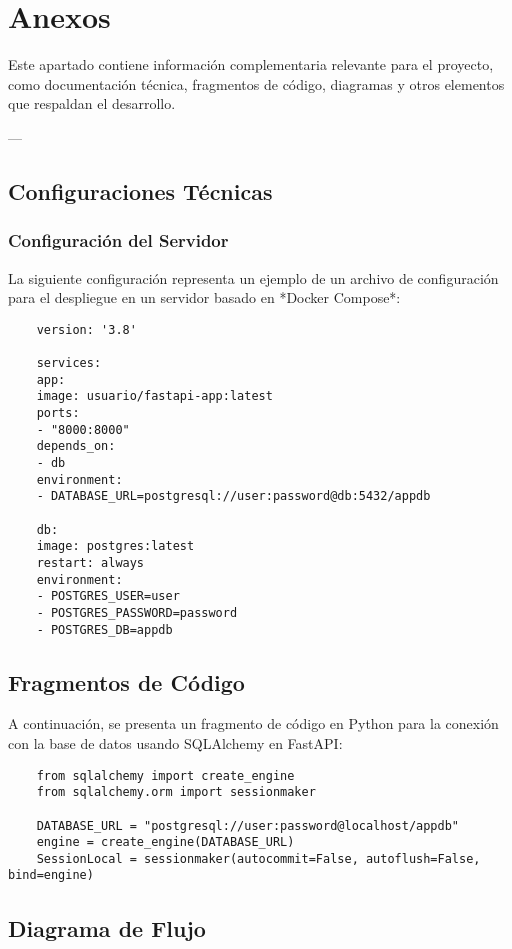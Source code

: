 \appendix
\chapter{Anexos}

Este apartado contiene información complementaria relevante para el proyecto, como documentación técnica, fragmentos de código, diagramas y otros elementos que respaldan el desarrollo.

---

\section{Configuraciones Técnicas}

\subsection{Configuración del Servidor}

La siguiente configuración representa un ejemplo de un archivo de configuración para el despliegue en un servidor basado en *Docker Compose*:

\begin{verbatim}
	version: '3.8'
	
	services:
	app:
	image: usuario/fastapi-app:latest
	ports:
	- "8000:8000"
	depends_on:
	- db
	environment:
	- DATABASE_URL=postgresql://user:password@db:5432/appdb
	
	db:
	image: postgres:latest
	restart: always
	environment:
	- POSTGRES_USER=user
	- POSTGRES_PASSWORD=password
	- POSTGRES_DB=appdb
\end{verbatim}


\section{Fragmentos de Código}

A continuación, se presenta un fragmento de código en Python para la conexión con la base de datos usando SQLAlchemy en FastAPI:

\begin{lstlisting}
	from sqlalchemy import create_engine
	from sqlalchemy.orm import sessionmaker
	
	DATABASE_URL = "postgresql://user:password@localhost/appdb"
	engine = create_engine(DATABASE_URL)
	SessionLocal = sessionmaker(autocommit=False, autoflush=False, bind=engine)
\end{lstlisting}


\section{Diagrama de Flujo}

